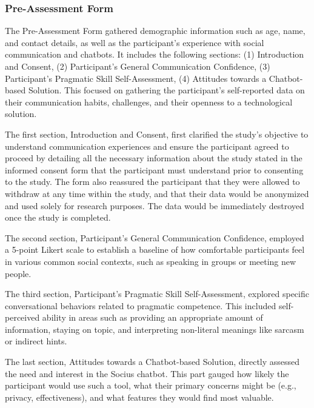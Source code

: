 \subsubsection{Pre-Assessment Form}
\indent The Pre-Assessment Form gathered demographic information such as age, name, and contact details, as well as the participant's experience with social 
communication and chatbots. It includes the following sections: (1) Introduction and Consent, (2) Participant's General Communication Confidence, 
(3) Participant's Pragmatic Skill Self-Assessment, (4) Attitudes towards a Chatbot-based Solution. This focused on gathering the participant's self-reported data on their communication habits, challenges, 
and their openness to a technological solution. 

The first section, Introduction and Consent, first clarified the study's objective to understand communication experiences and ensure the participant agreed to proceed 
by detailing all the necessary information about the study stated in the informed consent form that the participant must understand prior to consenting to the study. 
The form also reassured the participant that they were allowed to withdraw at any time within the study, and that their data would be anonymized and used solely for 
research purposes. The data would be immediately destroyed once the study is completed.

The second section, Participant's General Communication Confidence, employed a 5-point Likert scale to establish a baseline of how comfortable participants feel in various common social contexts, 
such as speaking in groups or meeting new people. 

The third section, Participant's Pragmatic Skill Self-Assessment, explored specific conversational behaviors related to pragmatic competence. This included self-perceived ability in areas such as providing an 
appropriate amount of information, staying on topic, and interpreting non-literal meanings like sarcasm or indirect hints.

The last section, Attitudes towards a Chatbot-based Solution, directly assessed the need and interest in the Socius chatbot. This part gauged how likely the participant would use such a tool, what their primary 
concerns might be (e.g., privacy, effectiveness), and what features they would find most valuable.

